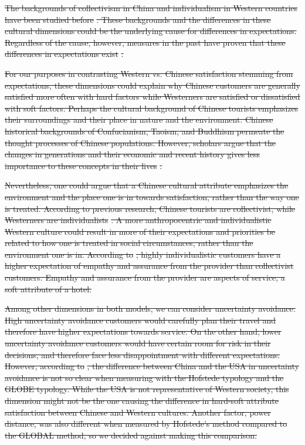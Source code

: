 \documentclass[smallextended,natbib]{svjour3}       %
\providecommand{\DIFdel}[1]{{\protect\color{red}\sout{#1}}}                      %
\begin{document}
\DIFdel{The backgrounds of collectivism in China and individualism in Western countries have been studied before }%
\DIFdel{. These backgrounds and the differences in these cultural dimensions could be the underlying cause for differences in expectations. Regardless of the cause, however, measures in the past have proven that these differences in expectations exist }%
\DIFdel{. 
}%

\DIFdel{For our purposes in contrasting Western vs. Chinese satisfaction stemming from expectations, these dimensions could explain why Chinese customers are generally satisfied more often with hard factors while Westerners are satisfied or dissatisfied with soft factors. Perhaps the cultural background of Chinese tourists emphasizes their surroundings and their place in nature and the environment. Chinese historical backgrounds of Confucianism, Taoism, and Buddhism permeate the thought processes of Chinese populations. However, scholars argue that the changes in generations and their economic and recent history gives less importance to these concepts in their lives }%
\DIFdel{. 
}%

\DIFdel{Nevertheless, one could argue that a Chinese cultural attribute emphasizes the environment and the place one is in towards satisfaction, rather than the way one is treated. According to previous research, Chinese tourists are collectivist, while Westerners are individualists }%
\DIFdel{. A more anthropocentric and individualistic Western culture could result in more of their expectations and priorities be related to how one is treated in social circumstances, rather than the environment one is in. According to }%
\DIFdel{, highly individualistic customers have a higher expectation of empathy and assurance from the provider than collectivist customers. Empathy and assurance from the provider are aspects of service, a soft attribute of a hotel. 
}%

\DIFdel{Among other dimensions in both models, we can consider uncertainty avoidance. High uncertainty avoidance customers would carefully plan their travel and therefore have higher expectations towards service. On the other hand, lower uncertainty avoidance customers would have certain room for risk in their decisions, and therefore face less disappointment with different expectations. However, according to }%
\DIFdel{, the difference between China and the USA in uncertainty avoidance is not so clear when measuring with the Hofstede typology and the GLOBE typology. While the USA is not representative of Western society, this dimension might not be the one causing the difference in hard-soft attribute satisfaction between Chinese and Western cultures. Another factor, power distance, was also different when measured by Hofstede's method compared to the GLOBAL method, so we decided against making this comparison.
}%
\end{document}
